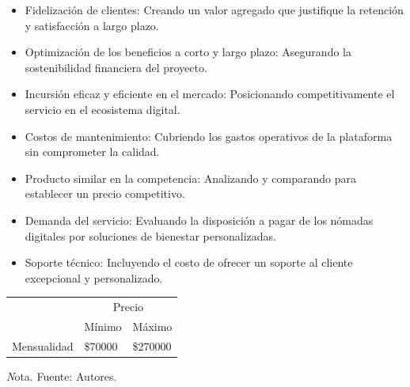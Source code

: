 {\begin{itemize}
    \item Fidelización de clientes: Creando un valor agregado que justifique la retención y satisfacción a largo plazo.
    \item Optimización de los beneficios a corto y largo plazo: Asegurando la sostenibilidad financiera del proyecto.
    \item Incursión eficaz y eficiente en el mercado: Posicionando competitivamente el servicio en el ecosistema digital.
    \item Costos de mantenimiento: Cubriendo los gastos operativos de la plataforma sin comprometer la calidad.
    \item Producto similar en la competencia: Analizando y comparando para establecer un precio competitivo.
    \item Demanda del servicio: Evaluando la disposición a pagar de los nómadas digitales por soluciones de bienestar personalizadas.
    \item Soporte técnico: Incluyendo el costo de ofrecer un soporte al cliente excepcional y personalizado.
\end{itemize}

\begin{adjustbox}{
            center,
            caption=[{Precio en el mercado actual}]{\centering Precio en el mercado actual (Valores en pesos colombianos COP). },
            label={Precio},
            nofloat=table, vspace={20px}}
            {
            \begin{threeparttable}
           \begin{tabular}{|p{11cm}|p{10cm}p{2cm}|}
                \hline
                \rowcolor[HTML]{D9EAD3} 
                \cellcolor[HTML]{D9EAD3}                              & \multicolumn{2}{c|}{\cellcolor[HTML]{D9EAD3}Precio}            \\ \cline{2-3} 
                \rowcolor[HTML]{D9EAD3} 
                \multirow{-2}{*}{\cellcolor[HTML]{D9EAD3}Suscripción} & \multicolumn{1}{l|}{\cellcolor[HTML]{D9EAD3}Mínimo} & Máximo   \\ \hline
                \multicolumn{1}{|l|}{Mensualidad}                     & \multicolumn{1}{l|}{\$70000}                       & \$270000 \\ \hline
            \end{tabular}
            \begin{tablenotes}
                \vspace{2mm}
               \textit Nota. Fuente: Autores.
            \end{tablenotes}
            

\end{threeparttable}}
\end{adjustbox}}
